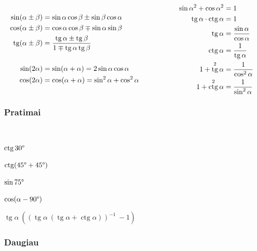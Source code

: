 \documentclass[fleqn]{article} %
\newenvironment{exercises}{\begin{enumerate*}[label=\alph*), itemjoin=\qquad]}{\end{enumerate*}}
\DeclareMathOperator{\tg}{tg}
\DeclareMathOperator{\ctg}{ctg}
\begin{document}
\begin{equation*} \\
    \begin{aligned}[c]
        \sin(\alpha \pm \beta) &= \sin\alpha\cos\beta \pm \sin\beta\cos\alpha \\
        \cos(\alpha \pm \beta) &= \cos\alpha\cos\beta \mp \sin\alpha\sin\beta \\
        \tg (\alpha \pm \beta) &= \frac{\tg\alpha \pm \tg\beta}{1 \mp \tg\alpha \tg\beta} \\ \\
        \sin(2\alpha) &= \sin(\alpha + \alpha) = 2\sin\alpha\cos\alpha \\
        \cos(2\alpha) &= \cos(\alpha + \alpha) = \sin^2\alpha + \cos^2\alpha
    \end{aligned}
    \hspace{20mm}
    \begin{aligned}[c]
        \sin{\alpha}^2 + \cos{\alpha}^2 &= 1 \\
        \tg \alpha \cdot \ctg \alpha &= 1 \\
        \tg \alpha &= \frac{\sin \alpha}{\cos \alpha} \\
        \ctg \alpha &= \frac{1}{\tg \alpha} \\
        1 + \tg^2 \alpha &= \frac{1}{\cos^2 \alpha} \\  
        1 + \ctg^2 \alpha &= \frac{1}{\sin^2 \alpha} \\  
    \end{aligned}
\end{equation*}

\subsubsection{Pratimai}

\begin{exercises} \\
    \item $\ctg 30\degree               $
    \item $\ctg(45\degree + 45\degree)  $
    \item $\sin 75\degree               $
    \item $\cos( \alpha - 90\degree )   $
    \item $\tg \alpha\ ((\tg\alpha\ (\tg \alpha + \ctg \alpha))^{-1}\ - 1) $ 
\end{exercises} 

\subsubsection{Daugiau}
\end{document}
